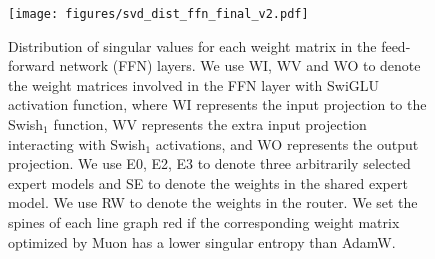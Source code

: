 \begin{figure}[t]
    \centering
    \texttt{[image: figures/svd\_dist\_ffn\_final\_v2.pdf]}
    \caption{Distribution of singular values for each weight matrix in the feed-forward network (FFN) layers. We use WI, WV and WO to denote the weight matrices involved in the FFN layer with SwiGLU activation function, where WI represents the input projection to the Swish$_1$ function, WV represents the extra input projection interacting with Swish$_1$ activations, and WO represents the output projection. We use E0, E2, E3 to denote three arbitrarily selected expert models and SE to denote the weights in the shared expert model. We use RW to denote the weights in the router. We set the spines of each line graph red if the corresponding weight matrix optimized by Muon has a lower singular entropy than AdamW.} 
    \label{fig_svd_ffn} 
\end{figure}